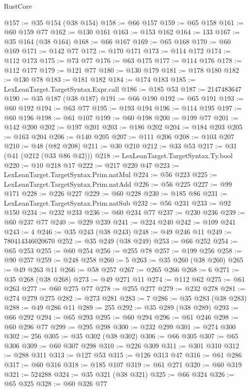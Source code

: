 \begin{lexlean}{RustCore}
\begin{coremodule}
@157 := @35 @154 (@38 @154)
@158 := @66 @157
@159 := @65 @158
@161 := @60 @159 @77
@162 := @130 @161
@163 := @153 @162
@164 := 133
@167 := @35 @164 (@38 @164)
@168 := @66 @167
@169 := @65 @168
@170 := @60 @169
@171 := @142 @77
@172 := @170 @171
@173 := @114 @172
@174 := @112 @173
@175 := @73 @77
@176 := @63 @175
@177 := @114 @176
@178 := @112 @177
@179 := @121 @77
@180 := @130 @179
@181 := @178 @180
@182 := @130 @78
@183 := @181 @182
@184 := @174 @183
@185 := LexLeanTarget.TargetSyntax.Expr.call
@186 := @185 @53
@187 := 2147483647
@190 := @35 @187 (@38 @187)
@191 := @66 @190
@192 := @65 @191
@193 := @60 @192
@194 := @63 @77
@195 := @193 @194
@196 := @114 @195
@197 := @60 @196
@198 := @61 @107
@199 := @60 @198
@200 := @199 @77
@201 := @142 @200
@202 := @197 @201
@203 := @186 @202
@204 := @184 @203
@205 := @163 @204
@206 := @140 @205
@207 := @111 @206
@208 := @103 @207
@210 := @48 (@82 @208)
@211 := @30 @210
@212 := @33 @53
@217 := @31 (@41 (@212 (@33 @86 @42)))
@218 := LexLeanTarget.TargetSyntax.Ty.bool
@220 := @10 @218 @17
@222 := @217 @220 @47
@223 := LexLeanTarget.TargetSyntax.Prim.natMul
@224 := @56 @223
@225 := LexLeanTarget.TargetSyntax.Prim.natAdd
@226 := @56 @225
@227 := @99 @171
@228 := @226 @227
@229 := @60 @228
@230 := @185 @86
@231 := LexLeanTarget.TargetSyntax.Prim.natSub
@232 := @56 @231
@233 := @92 @150
@234 := @232 @233
@236 := @60 @234 @77
@237 := @230 @236
@239 := @60 @237 @77
@240 := @229 @239
@241 := @224 @240
@242 := @109 @241
@243 := 4
@246 := @35 @243 (@38 @243)
@248 := @49 @246 @11
@249 := 780414346020670
@252 := @35 @249 (@38 @249)
@253 := @66 @252
@254 := @65 @253
@255 := @60 @254
@256 := @255 @78
@257 := @199 @256
@258 := @90 @257
@259 := @248 @258
@260 := 5
@263 := @35 @260 (@38 @260)
@265 := @49 @263 @11
@266 := @58 @257
@267 := @265 @266
@268 := 6
@271 := @35 @268 (@38 @268)
@273 := @49 @271 @11
@274 := @112 @62
@275 := @61 @263
@277 := @60 @275 @77
@278 := @255 @277
@279 := @232 @278
@281 := @274 @279 @275
@282 := @273 @281
@283 := 7
@286 := @35 @283 (@38 @283)
@288 := @49 @286 @11
@289 := 255
@292 := @35 @289 (@38 @289)
@293 := @66 @292
@294 := @65 @293
@295 := @60 @294
@296 := @61 @246
@298 := @60 @296 @77
@299 := @295 @298
@300 := @232 @299
@301 := @274 @300
@302 := 256
@305 := @35 @302 (@38 @302)
@306 := @66 @305
@307 := @65 @306
@309 := @60 @307 @298
@310 := @226 @309
@311 := @301 @310
@312 := @288 @311
@313 := @127 @53
@315 := @126 @313 @47
@316 := @61 @286
@317 := @60 @316
@318 := @185 @107
@319 := @61 @271
@320 := @60 @319
@321 := 524288
@324 := @35 @321 (@38 @321)
@325 := @66 @324
@326 := @65 @325
@328 := @60 @326 @77

\end{coremodule}
\end{lexlean}
